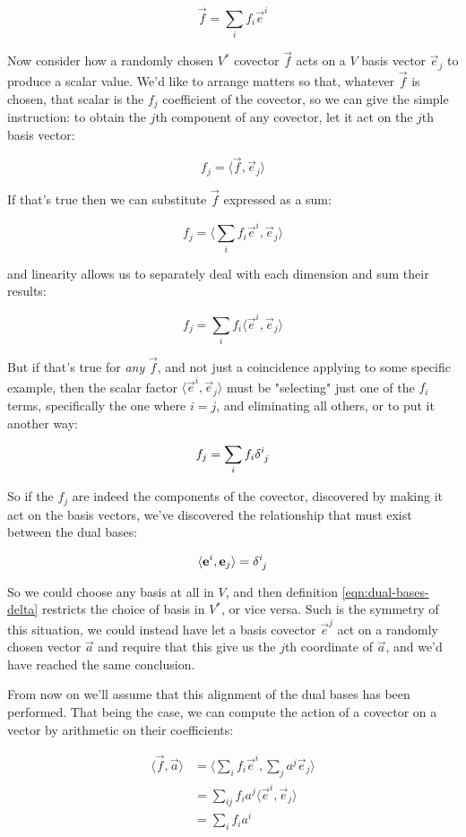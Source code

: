 $$
\vec{f} = \sum_i f_i \vec{e}^i
$$

Now consider how a randomly chosen $V^*$ covector $\vec{f}$ acts on a $V$ basis vector $\vec{e}_j$ to produce a scalar value. We'd like to arrange matters so that, whatever $\vec{f}$ is chosen, that scalar is the $f_j$ coefficient of the covector, so we can give the simple instruction: to obtain the $j$th component of any covector, let it act on the $j$th basis vector:

$$
f_j = \langle \vec{f} , \vec{e}_j\rangle
$$

If that's true then we can substitute $\vec{f}$ expressed as a sum:

$$
f_j = \langle \sum_i f_i \vec{e}^i , \vec{e}_j\rangle
$$

and linearity allows us to separately deal with each dimension and sum their results:

$$
f_j = \sum_i f_i \langle \vec{e}^i , \vec{e}_j\rangle
$$

But if that's true for \textit{any} $\vec{f}$, and not just a coincidence applying to some specific example, then the scalar factor $\langle \vec{e}^i , \vec{e}_j\rangle$ must be "selecting" just one of the $f_i$ terms, specifically the one where $i = j$, and eliminating all others, or to put it another way:

$$
f_j = \sum_i f_i \delta \indices{^i_j}
$$

So if the $f_j$ are indeed the components of the covector, discovered by making it act on the basis vectors, we've discovered the relationship that must exist between the dual bases:

\begin{equation}
    \langle \vec{e}^i,\vec{e}_j\rangle = \delta\indices{^i_j}
    \label{eqn:dual-bases-delta}
\end{equation}

So we could choose any basis at all in $V$, and then definition \eqref{eqn:dual-bases-delta} restricts the choice of basis in $V^*$, or vice versa. Such is the symmetry of this situation, we could instead have let a basis covector $\vec{e}^j$ act on a randomly chosen vector $\vec{a}$ and require that this give us the $j$th coordinate of $\vec{a}$, and we'd have reached the same conclusion.

From now on we'll assume that this alignment of the dual bases has been performed. That being the case, we can compute the action of a covector on a vector by arithmetic on their coefficients:

\begin{equation}
    \begin{split}
        \langle \vec{f},\vec{a}\rangle 
        &= \langle \sum_i f_i \vec{e}^i , \sum_j a^j \vec{e}_j \rangle \\
        &= \sum_{ij} f_i a^j \langle\vec{e}^i,\vec{e}_j\rangle \\
        &= \sum_{i} f_i a^i
    \end{split}
\end{equation}

